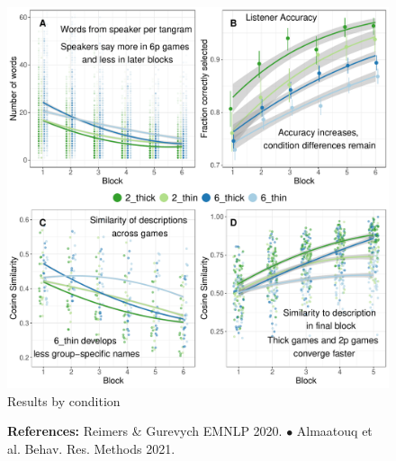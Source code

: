 \documentclass[11pt,a4paper]{article}
\begin{document}
\begin{figure}
	\includegraphics[width=\textwidth]{../images/CAMP1.pdf}
	\caption{Results by condition}
\end{figure}

\begin{figure} \textbf{References:} Reimers \& Gurevych EMNLP 2020. $\bullet$ Almaatouq et al. Behav. Res. Methods 2021. \end{figure}
\end{document}
